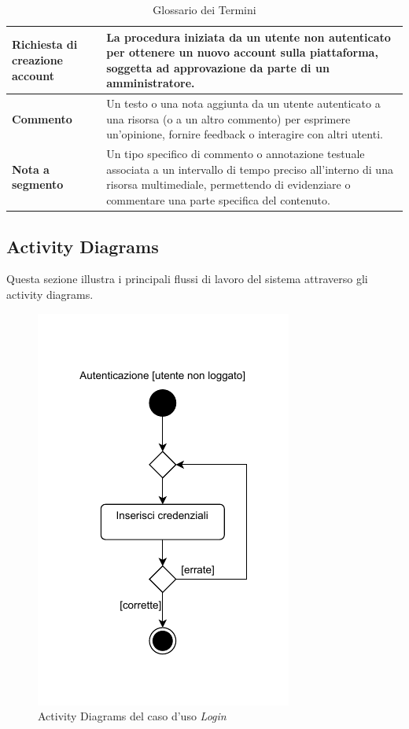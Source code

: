\documentclass[a4paper]{article}
\begin{document}
\begin{table}[H]
\begin{tabular}{|>{\bfseries}p{}|p{}|}
        \hline
        Richiesta di creazione account & La procedura iniziata da un utente non autenticato per ottenere un nuovo account sulla piattaforma, soggetta ad approvazione da parte di un amministratore. \\
        \hline
        Commento & Un testo o una nota aggiunta da un utente autenticato a una risorsa (o a un altro commento) per esprimere un'opinione, fornire feedback o interagire con altri utenti. \\
        \hline
        Nota a segmento & Un tipo specifico di commento o annotazione testuale associata a un intervallo di tempo preciso all'interno di una risorsa multimediale, permettendo di evidenziare o commentare una parte specifica del contenuto. \\
        \hline
    \end{tabular}
    \caption{Glossario dei Termini}
    \label{tab:glossary}
\end{table}

\subsection{Activity Diagrams}
Questa sezione illustra i principali flussi di lavoro del sistema attraverso gli activity diagrams.

\begin{figure}[H]
    \centering
    \includegraphics{./figures/autenticazione_ac}
    \caption{Activity Diagrams del caso d'uso \textit{Login}}
    \label{fig:ac_login}
\end{figure}
\end{document}
